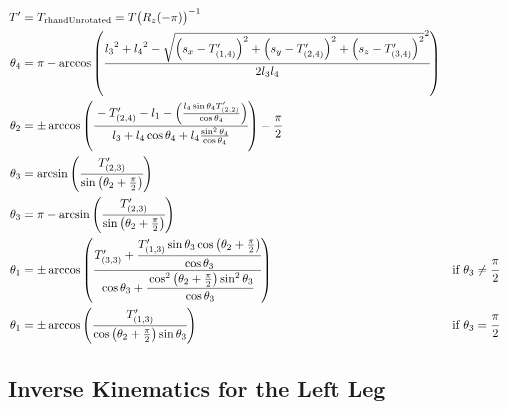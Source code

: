 \begin{align*}
T' &= T_\text{rhandUnrotated} = T{\big(R_z(-\pi)\big)}^{-1}\\
\theta_4 &= \pi - \arccos\left(\cfrac{{l_3}^2 + {l_4}^2 - \sqrt{\left(s_x-T'_{(1,4)}\right)^2 + \left(s_y-T'_{(2,4)}\right)^2 + \left(s_z-T'_{(3,4)}\right)^2}^2 }{2 l_3 l_4}\right)\\
\theta_2 &= \pm\arccos\left(\cfrac{ - T'_{(2,4)} - l_1 - \left(\frac{l_4\sin\theta_4T'_{(2,2)}}{\cos\theta_4} \right)}{l_3 +l_4\cos\theta_4 + l_4\frac{\sin^2\theta_4}{\cos\theta_4}}\right)-\frac{\pi}{2}\\
\theta_3 &= \arcsin\left(\cfrac{T'_{(2,3)}}{\sin\left(\theta_2 + \frac{\pi}{2}\right)}\right)\\
\theta_3 &= \pi - \arcsin\left(\cfrac{T'_{(2,3)}}{\sin\left(\theta_2 + \frac{\pi}{2}\right)}\right) \\
\theta_1 &= \pm\arccos\left(\cfrac{T'_{(3,3)} + \cfrac{T'_{(1,3)}\sin\theta_3\cos\left(\theta_2 + \frac{\pi}{2}\right)}{\cos\theta_3}}{\cos\theta_3 + \cfrac{\cos^2\left(\theta_2 + \frac{\pi}{2}\right)\sin^2\theta_3}{\cos\theta_3}}\right) &\text{if } \theta_3 \neq \cfrac{\pi}{2}& \\
\theta_1 &= \pm\arccos\left(\cfrac{T'_{(1,3)}}{\cos\left(\theta_2 +\frac{\pi}{2}\right)\sin\theta_3}\right) &\text{if } \theta_3 = \cfrac{\pi}{2}
\end{align*}





\subsection{Inverse Kinematics for the Left Leg}

